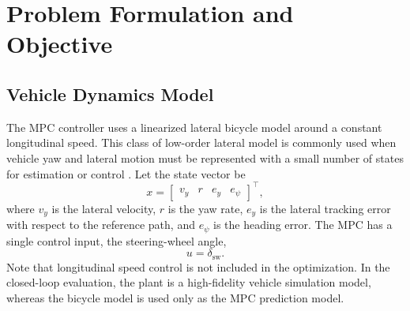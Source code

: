 \documentclass[10pt,twocolumn]{ICCAS}
\begin{document}
\section{Problem Formulation and Objective}
\label{sec:problem}

\subsection{Vehicle Dynamics Model}
\label{subsec:vehicle_model}

The MPC controller uses a linearized lateral bicycle model around a constant
longitudinal speed. This class of low-order lateral model is commonly used when
vehicle yaw and lateral motion must be represented with a small number of
states for estimation or control \cite{rajamani2006vehicle,reina2017vehicle}. Let
the state vector be
\begin{equation}
x =
\begin{bmatrix}
v_y & r & e_y & e_\psi
\end{bmatrix}^{\top},
\label{eq:state_vector}
\end{equation}
where $v_y$ is the lateral velocity, $r$ is the yaw rate, $e_y$ is the lateral
tracking error with respect to the reference path, and $e_\psi$ is the heading
error. The MPC has a single control input, the steering-wheel angle,
\begin{equation}
u = \delta_{\mathrm{sw}}.
\label{eq:control_input}
\end{equation}
Note that longitudinal speed control is not included in the optimization. In the
closed-loop evaluation, the plant is a high-fidelity vehicle simulation model,
whereas the bicycle model is used only as the MPC prediction model.
\end{document}
